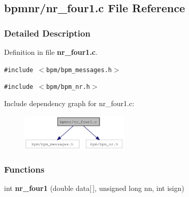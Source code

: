 \subsection{bpmnr/nr\_\-four1.c File Reference}
\label{nr__four1_8c}


\subsubsection{Detailed Description}


Definition in file {\bf nr\_\-four1.c}.

{\tt \#include $<$bpm/bpm\_\-messages.h$>$}\par
{\tt \#include $<$bpm/bpm\_\-nr.h$>$}\par


Include dependency graph for nr\_\-four1.c:\nopagebreak
\begin{figure}[H]
\begin{center}
\leavevmode
\includegraphics[width=147pt]{nr__four1_8c__incl}
\end{center}
\end{figure}
\subsubsection*{Functions}
\begin{CompactItemize}
\item 
int {\bf nr\_\-four1} (double data[$\,$], unsigned long nn, int isign)
\end{CompactItemize}
